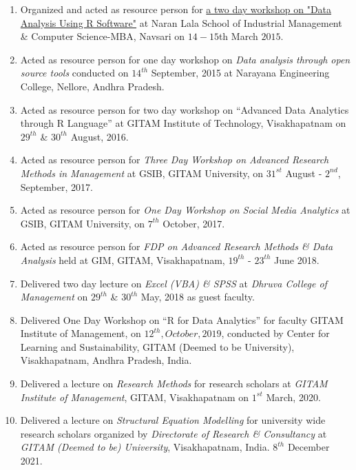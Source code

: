 \documentclass[10pt]{article}
\begin{document}
\begin{enumerate} 

\item Organized and acted as resource person for \href{http://www.naranlala.edu.in/Faculty\%20Development\%20Programme.pdf}{a two day workshop on "Data Analysis Using R Software"} at Naran Lala School of Industrial Management & Computer Science-MBA, Navsari on $14-15$th March $2015$. 

\item Acted as resource person for one day workshop on \emph{Data analysis through open source tools} conducted on $14^{th}$ September, 2015 at Narayana Engineering College, Nellore, Andhra Pradesh.  

\item Acted as resource person for two day workshop on \enquote{Advanced Data Analytics through R Language} at GITAM Institute of Technology, Visakhapatnam on $29^{th}$ \& $30^{th}$ August, 2016.

\item Acted as resource person for \emph{Three Day Workshop on Advanced Research Methods in Management} at GSIB, GITAM University, on $31^{st}$ August - $2^{nd}$, September, 2017.

\item Acted as resource person for \emph{One Day Workshop on Social Media Analytics} at GSIB, GITAM University, on $7^{th}$ October, 2017.

\item Acted as resource person for \emph{FDP on Advanced Research Methods & Data Analysis} held at GIM, GITAM, Visakhapatnam, $19^{th}$ - $23^{th}$ June 2018. 

\item Delivered two day lecture on \emph{Excel (VBA) \& SPSS} at \emph{Dhruva College of Management} on $29^{th}$ \& $30^{th}$ May, 2018 as guest faculty. 

\item Delivered One Day Workshop on \enquote{R for Data Analytics} for faculty GITAM Institute of Management, on $12^{th}, October, 2019$, conducted by Center for Learning and Sustainability, GITAM (Deemed to be University), Visakhapatnam, Andhra Pradesh, India. 

\item Delivered a lecture on \emph{Research Methods} for research scholars at \emph{GITAM Institute of Management}, GITAM, Visakhapatnam on $1^{st}$ March, 2020. 

\item Delivered a lecture on \emph{Structural Equation Modelling} for university wide research scholars organized by \emph{Directorate of Research \& Consultancy} at \emph{GITAM (Deemed to be) University}, Visakhapatnam, India. $8^{th}$ December 2021. 


\end{enumerate}
\end{document}
